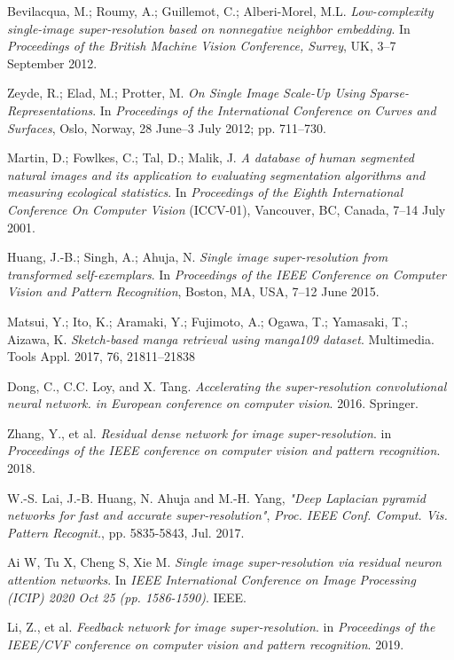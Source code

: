 \documentclass{ieeeaccess}
\begin{document}
\begin{thebibliography}{00}
 Bevilacqua, M.; Roumy, A.; Guillemot, C.; Alberi-Morel, M.L. \textit{Low-complexity single-image super-resolution based on nonnegative neighbor embedding}. In \textit{Proceedings of the British Machine Vision Conference, Surrey}, UK, 3–7 September 2012.

 Zeyde, R.; Elad, M.; Protter, M. \textit{On Single Image Scale-Up Using Sparse-Representations}. In \textit{Proceedings of the International Conference on Curves and Surfaces}, Oslo, Norway, 28 June–3 July 2012; pp. 711–730.

 Martin, D.; Fowlkes, C.; Tal, D.; Malik, J. \textit{A database of human segmented natural images and its application to evaluating segmentation algorithms and measuring ecological statistics}. In \textit{Proceedings of the Eighth International Conference On Computer Vision} (ICCV-01), Vancouver, BC, Canada, 7–14 July 2001.

 Huang, J.-B.; Singh, A.; Ahuja, N. \textit{Single image super-resolution from transformed self-exemplars}. In \textit{Proceedings of the IEEE Conference on Computer Vision and Pattern Recognition}, Boston, MA, USA, 7–12 June 2015.

 Matsui, Y.; Ito, K.; Aramaki, Y.; Fujimoto, A.; Ogawa, T.; Yamasaki, T.; Aizawa, K. \textit{Sketch-based manga retrieval using manga109 dataset}. Multimedia. Tools Appl. 2017, 76, 21811–21838 

 Dong, C., C.C. Loy, and X. Tang. \textit{Accelerating the super-resolution convolutional neural network. in European conference on computer vision}. 2016. Springer.

 Zhang, Y., et al. \textit{Residual dense network for image super-resolution}. in \textit{Proceedings of the IEEE conference on computer vision and pattern recognition}. 2018.

 W.-S. Lai, J.-B. Huang, N. Ahuja and M.-H. Yang, \textit{"Deep Laplacian pyramid networks for fast and accurate super-resolution"}, \textit{Proc. IEEE Conf. Comput. Vis. Pattern Recognit.}, pp. 5835-5843, Jul. 2017.

 Ai W, Tu X, Cheng S, Xie M. \textit{Single image super-resolution via residual neuron attention networks}. In \textit{IEEE International Conference on Image Processing (ICIP) 2020 Oct 25 (pp. 1586-1590)}. IEEE.

 Li, Z., et al. \textit{Feedback network for image super-resolution}. in \textit{Proceedings of the IEEE/CVF conference on computer vision and pattern recognition}. 2019.


\end{thebibliography}
\end{document}
